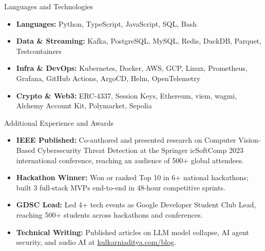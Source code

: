 \documentclass[]{mcdowellcv}
\begin{document}
\begin{cvsection}{Languages and Technologies}
  \begin{cvsubsection}{}{}{}
    \begin{itemize}
      \item \textbf{Languages:} Python, TypeScript, JavaScript, SQL, Bash
      \item \textbf{Data \& Streaming:} Kafka, PostgreSQL, MySQL, Redis, DuckDB, Parquet, Testcontainers
      \item \textbf{Infra \& DevOps:} Kubernetes, Docker, AWS, GCP, Linux, Prometheus, Grafana, GitHub Actions, ArgoCD, Helm, OpenTelemetry
      \item \textbf{Crypto \& Web3:} ERC-4337, Session Keys, Ethereum, viem, wagmi, Alchemy Account Kit, Polymarket, Sepolia
    \end{itemize}
  \end{cvsubsection}
\end{cvsection}

\begin{cvsection}{Additional Experience and Awards}
  \begin{cvsubsection}{}{}{}
    \begin{itemize}
      \item \textbf{IEEE Published:} Co-authored and presented research on Computer Vision-Based Cybersecurity Threat Detection at the Springer icSoftComp 2023 international conference, reaching an audience of 500+ global attendees.
      \item \textbf{Hackathon Winner:} Won or ranked Top 10 in 6+ national hackathons; built 3 full-stack MVPs end-to-end in 48-hour competitive sprints.
      \item \textbf{GDSC Lead:} Led 4+ tech events as Google Developer Student Club Lead, reaching 500+ students across hackathons and conferences.
      \item \textbf{Technical Writing:} Published articles on LLM model collapse, AI agent security, and audio AI at \href{https://www.kulkarniaditya.com/blog}{kulkarniaditya.com/blog}.
    \end{itemize}
  \end{cvsubsection}
\end{cvsection}
\end{document}
